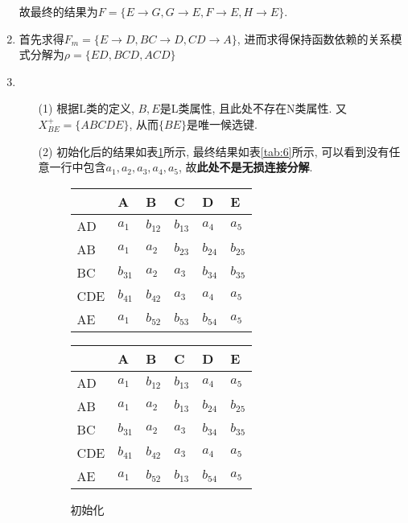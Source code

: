 \documentclass[10pt, a4paper]{article}
\begin{document}
\begin{enumerate}
\begin{enumerate}
		\end{enumerate}
		故最终的结果为$F=\{E\to G, G\to E, F\to E, H\to E\}$.
		\item 首先求得$F_m=\{E\to D, BC\to D, CD\to A\}$, 进而求得保持函数依赖的关系模式分解为$\rho = \{ED, BCD, ACD\}$
		\item \begin{enumerate}
			\item[(1)] 根据L类的定义, $B, E$是L类属性, 且此处不存在N类属性. 又$X_{BE}^+ = \{ABCDE\}$, 从而$\{BE\}$是唯一候选键.
			\item[(2)] 初始化后的结果如表\ref{tab:1}所示, 最终结果如表\ref{tab:6}所示, 可以看到没有任意一行中包含$a_1, a_2, a_3, a_4, a_5$, 故\textbf{此处不是无损连接分解}.
			\begin{figure}[H]
				\begin{minipage}[b]{0.5\linewidth}
					\centering
					\begin{tabular}{|l|l|l|l|l|l|}
						\hline
							& A & B & C & D & E \\ \hline
						AD  & $a_1$ & $b_{12}$ & $b_{13}$  & $a_4$  & $a_5$  \\ \hline
						AB  & $a_1$ & $a_2$  & $b_{23}$  & $b_{24}$ & $b_{25}$  \\ \hline
						BC  & $b_{31}$ &  $a_2$ & $a_3$ & $b_{34}$ & $b_{35}$ \\ \hline
						CDE & $b_{41}$ & $b_{42}$ & $a_3$ & $a_4$ & $a_5$ \\ \hline
						AE  & $a_1$ & $b_{52}$ & $b_{53}$ & $b_{54}$ & $a_5$ \\ \hline
						\end{tabular}
						\caption{初始化}\label{tab:1}
				\end{minipage}
				\begin{minipage}[b]{0.5\linewidth}
					\centering
					\begin{tabular}{|l|l|l|l|l|l|}
						\hline
							& A & B & C & D & E \\ \hline
						AD  & $a_1$ & $b_{12}$ & $b_{13}$  & $a_4$  & $a_5$  \\ \hline
						AB  & $a_1$ & $a_2$  & $b_{13}$  & $b_{24}$ & $b_{25}$  \\ \hline
						BC  & $b_{31}$ &  $a_2$ & $a_3$ & $b_{34}$ & $b_{35}$ \\ \hline
						CDE & $b_{41}$ & $b_{42}$ & $a_3$ & $a_4$ & $a_5$ \\ \hline
						AE  & $a_1$ & $b_{52}$ & $b_{13}$ & $b_{54}$ & $a_5$ \\ \hline
						\end{tabular}

\end{minipage}
\end{figure}
\end{enumerate}
\end{enumerate}
\end{document}
